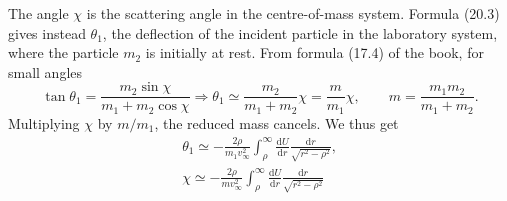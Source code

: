 \begin{problem}[title={Deriving the small-angle scattering formula}]
{The angle $\chi$ is the scattering angle in the centre-of-mass system. Formula (20.3) gives instead $\theta_1$, the deflection of the incident particle in the laboratory system, where the particle $m_2$ is initially at rest. From formula (17.4) of the book, for small angles
\begin{equation*}
    \tan{\theta_1} = \frac{m_2\sin{\chi}}{m_1 + m_2\cos{\chi}} \Rightarrow \theta_1 \simeq \frac{m_2}{m_1 + m_2}\chi = \frac{m}{m_1}\chi, \qquad m = \frac{m_1m_2}{m_1 + m_2}.
\end{equation*}
Multiplying $\chi$ by $m/m_1$, the reduced mass cancels. We thus get
}
{
\begin{gather*}
    \theta_1 \simeq -\frac{2\rho}{m_1v_\infty^2}\int_\rho^\infty \frac{\mathrm{d}U}{\mathrm{d}r}\frac{\mathrm{d}r}{\sqrt{r^2 - \rho^2}}, \\
    \chi \simeq -\frac{2\rho}{mv_\infty^2}\int_\rho^\infty \frac{\mathrm{d}U}{\mathrm{d}r}\frac{\mathrm{d}r}{\sqrt{r^2 - \rho^2}}
\end{gather*}
}
\end{problem}


